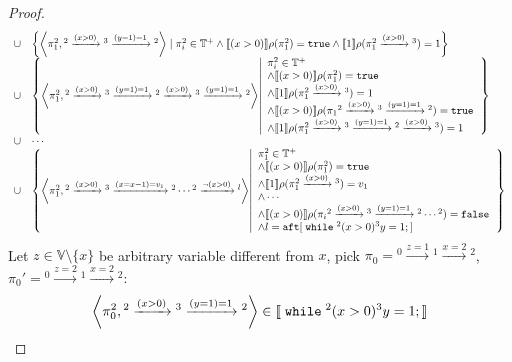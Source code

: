 \begin{example}
\begin{proof}
\begin{equation}
\begin{array}{ll}
 \cup & \left\{ \left< \pi_1^2, {}^2 \xrightarrow{(x > 0)} {}^3 \xrightarrow{(y = 1) = 1} {}^2 \right> 
 \mid \pi_i^2 \in \mathbb{T^{+}} \land 
 \sem{(x > 0)}\env(\pi_1^2) = \etrue  \land
 \sem{1}\env(\pi_1^2 \xrightarrow{(x > 0)} {}^3) = 1 \right\}
 \\
 \cup & \left\{ \left< \pi_1^2, {}^2 \xrightarrow{(x > 0)} {}^3 \xrightarrow{(y = 1) = 1} {}^2 \xrightarrow{(x > 0)} {}^3 \xrightarrow{(y = 1) = 1} {}^2 \right> 
 \left \vert 
 \begin{array}{l}
 \pi_i^2 \in \mathbb{T^{+}} \\
 \land 
 \sem{(x > 0)}\env(\pi_1^2) = \etrue  \\
 \land
 \sem{1}\env(\pi_1^2 \xrightarrow{(x > 0)} {}^3) = 1 \\
 \land 
 \sem{(x > 0)}\env(\pi_1{}^2 \xrightarrow{(x > 0)} {}^3 \xrightarrow{(y = 1) = 1} {}^2) = \etrue \\
 \land
 \sem{1}\env(\pi_1^2 \xrightarrow{(x > 0)} {}^3 \xrightarrow{(y = 1) = 1} {}^2 \xrightarrow{(x > 0)} {}^3) = 1
 \end{array}
 \right.
 \right\}
 \\
 \cup & \cdots 
 \\
 \cup & \left\{ \left< \pi_1^2, {}^2 \xrightarrow{(x > 0)} {}^3\xrightarrow{(x = x - 1) = v_1} {}^2 \cdots  {}^2 \xrightarrow{\neg(x > 0)} {}^l \right>  
 \left \vert 
 \begin{array}{l}
 \pi_1^2 \in \mathbb{T^{+}}\\
 \land 
 \sem{(x > 0)}\env(\pi_1^2) = \etrue  \\
 \land
 \sem{1}\env(\pi_1^2 \xrightarrow{(x > 0)} {}^3) = v_1 \\
 \land \cdots \\
 \land 
 \sem{(x > 0)}\env(\pi_i{}^2 \xrightarrow{(x > 0)} {}^3\xrightarrow{(y = 1) = 1} {}^2 \cdots {}^2) = \efalse \\
 \land l = \kw{aft}[\ewhile {}^2 (x > 0) {}^3 y = 1;]
 \end{array}
 \right.
 \right\}
 \end{array}
 \end{equation}
 Let $z \in \mathbb{V}\setminus \{x\}$ be arbitrary variable different from $x$,
 pick $\pi_0 = {}^0 \xrightarrow{z = 1} {}^1 \xrightarrow{x = 2} {}^2$, 
 $\pi_0' = {}^0 \xrightarrow{z = 2} {}^1 \xrightarrow{x = 2} {}^2$:
 \[
 	\left< \pi_0^2, {}^2 \xrightarrow{(x > 0)} {}^3 \xrightarrow{(y = 1) = 1} {}^2 \right> \in \sem{\ewhile {}^2 (x > 0) {}^3 y = 1;}
\]
\end{proof}
\end{example}
